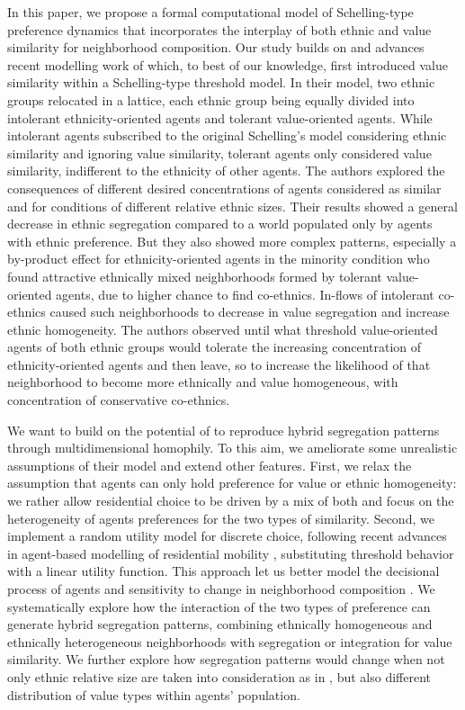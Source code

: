 \documentclass{article}
\begin{document}
In this paper, we propose a formal computational model of Schelling-type preference dynamics that incorporates the interplay of both ethnic and value similarity for neighborhood composition. Our study builds on and advances recent modelling work of \textcite{paolillo2018} which, to best of our knowledge, first introduced value similarity within a Schelling-type threshold model. In their model, two ethnic groups relocated in a lattice, each ethnic group being equally divided into intolerant ethnicity-oriented agents and tolerant value-oriented agents. While intolerant agents subscribed to the original Schelling's model considering ethnic similarity  and ignoring value similarity, tolerant agents only considered value similarity, indifferent to the ethnicity of other agents. The authors explored the consequences of different desired concentrations of agents considered as similar and for conditions of different relative ethnic sizes. Their results showed a general decrease in ethnic segregation compared to a world populated only by agents with ethnic preference. But they also showed more complex patterns, especially a by-product effect for ethnicity-oriented agents in the minority condition who found attractive ethnically mixed neighborhoods formed by tolerant value-oriented agents, due to higher chance to  find co-ethnics. In-flows of intolerant co-ethnics caused such neighborhoods to decrease in value segregation and increase ethnic homogeneity. The authors observed until what threshold value-oriented agents of both ethnic groups would tolerate the increasing concentration of ethnicity-oriented agents and then leave, so to increase the likelihood of that neighborhood to become more ethnically and value homogeneous, with concentration of conservative co-ethnics.

We want to build on the potential of \textcite{paolillo2018} to reproduce hybrid segregation patterns through multidimensional homophily. To this aim, we ameliorate some unrealistic assumptions of their model and extend other features. First, we relax the assumption that agents can only hold preference for value or ethnic homogeneity: we rather allow residential choice to be driven by a mix of both and focus on the heterogeneity of agents preferences for the two types of similarity. Second, we implement a random utility model for discrete choice, following recent advances in agent-based modelling of residential mobility \autocite{bruch2006neighborhood,bruch2012methodological}, substituting threshold behavior with a linear utility function. This approach let us better model the decisional process of agents and sensitivity to change in neighborhood composition \autocite{van2009neighborhood}. We systematically explore how the interaction of the two types of preference can generate hybrid segregation patterns, combining ethnically homogeneous and ethnically heterogeneous neighborhoods with segregation or integration for value similarity. We further explore how segregation patterns would change when not only ethnic relative size are taken into consideration as in \textcite{paolillo2018}, but also different distribution of value types within agents' population.
\end{document}
